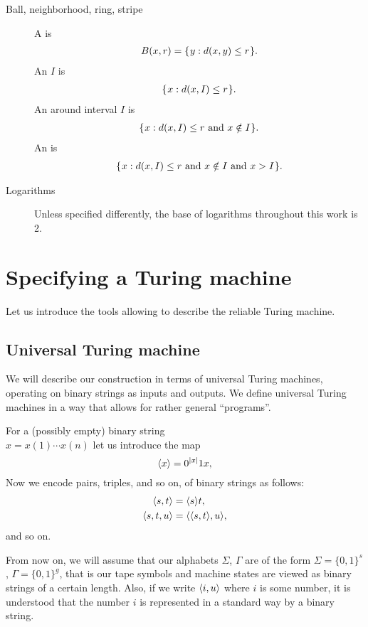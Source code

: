 \documentclass[11pt]{memoir}
\theoremstyle{definition} %
\renewcommand{\le}{\leq}
\begin{document}
\begin{description}
\item [Ball, neighborhood, ring, stripe]
A  is
\begin{align*}
    B(x,r)= \setOf{y}{d(x,y)\le r}.
\end{align*}
An  \( I \) is
\begin{align*}
    \setOf{x}{d(x,I)\le r}.
\end{align*}
An  around interval \( I \) is
\begin{align*}
    \setOf{x}{d(x,I)\le r \txt{ and } x \notin I}.
\end{align*}
An  is
\begin{align*}
    \setOf{x}{d(x,I)\le r \txt{ and } x \notin I \txt{ and } x>I}.
\end{align*}

\item[Logarithms] Unless specified differently,
the base of logarithms throughout this work is 2.

\end{description}


\section{Specifying a Turing machine}\label{sec:specifying}

Let us introduce the tools allowing to describe the reliable Turing machine.

\subsection{Universal Turing machine}\label{sec:UTM}

We will describe our construction in terms of
universal Turing machines,
operating on binary strings as inputs and outputs.
We define universal Turing machines in a way that allows
for rather general ``programs''.

 \begin{definition}
For a (possibly empty) binary string\\ \( x=x(1)\dotsm x(n) \) let us introduce the map
 \[
   {\mathopen\langle x\mathclose\rangle} = 0^{\lvert x \rvert}1 x,
 \]
Now we encode pairs, triples, and so on, of binary strings as follows:
 \begin{align*}
        {\mathopen\langle s,t\mathclose\rangle} &={\mathopen\langle s\mathclose\rangle}t,
\\ {\mathopen\langle s,t,u\mathclose\rangle} &= {\mathopen\langle {\mathopen\langle s,t\mathclose\rangle},u\mathclose\rangle},
 \end{align*}
and so on.

From now on, we will assume that our alphabets \( \Sigma \), \( \Gamma \)
are of the form \( \Sigma=\{0,1\}^{s} \), \( \Gamma=\{0,1\}^{g} \), that is 
our tape symbols and machine states are viewed as binary strings of a certain length.
Also, if we write \( {\mathopen\langle i,u\mathclose\rangle} \) where \( i \) is some number, it is understood
that the number \( i \) is represented in a standard way by a binary string.
\end{definition}
\end{document}

